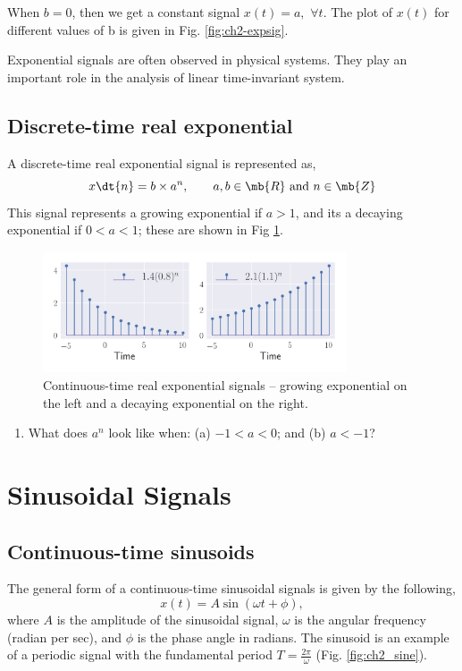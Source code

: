 When $b = 0$, then we get a constant signal $x\left(t\right) = a, \,\, \forall t$. The plot of $x\left(t\right)$ for different values of b is given in Fig. \ref{fig:ch2-expsig}.

Exponential signals are often observed in physical systems. They play an important role in the analysis of linear time-invariant system. 

\subsection{Discrete-time real exponential}
A discrete-time real exponential signal is represented as,
\[ x\dt{n} = b \times a^n, \quad \quad a, b \in \mb{R} \text{ and } n \in \mb{Z} \]
This signal represents a growing exponential if $a > 1$, and its a decaying exponential if $0 < a < 1$; these are shown in Fig \ref{fig:ch2_discexpsig}. 

\begin{figure}[h]
    \centering
    \includegraphics[width=0.8\textwidth]{figs/ch2-discexpsig.png}
    \caption{Continuous-time real exponential signals -- growing exponential on the left and a decaying exponential on the right.} \label{fig:ch2_discexpsig}
\end{figure}

\begin{problem*}[frametitle=Discrete-time exponential signals]
    \begin{enumerate}
        \item What does $a^n$ look like when: (a) $-1 < a < 0$; and (b) $a < -1$?
    \end{enumerate}
\end{problem*}

\section{Sinusoidal Signals}
\subsection{Continuous-time sinusoids}
The general form of a continuous-time sinusoidal signals is given by the following,
\[ x\left(t\right) = A\sin\left(\omega t + \phi\right), \]
\noindent where $A$ is the amplitude of the sinusoidal signal, $\omega$ is the angular frequency (radian per sec), and $\phi$ is the phase angle in radians. The sinusoid is an example of a periodic signal with the fundamental period $T = \frac{2\pi}{\omega}$ (Fig. \ref{fig:ch2_sine}).

